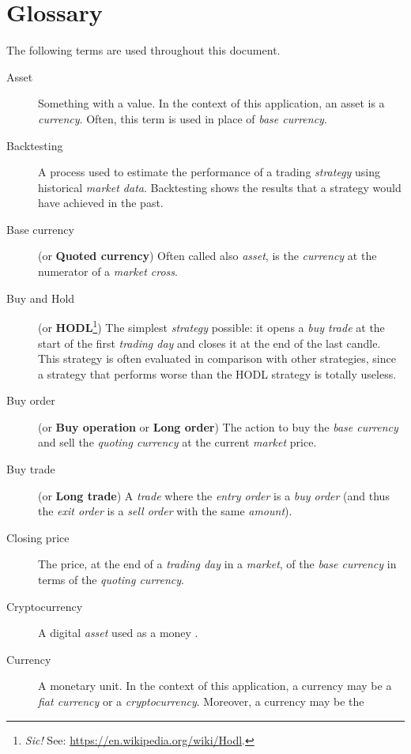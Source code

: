 \chapter{Glossary}\label{appendix:glossary}

The following terms are used throughout this document.

\begin{description}
	\item[Asset] Something with a value. In the context of this application,
		an asset is a \textit{currency}. Often, this term is used in
		place of \textit{base currency}.
	\item[Backtesting] A process used to estimate the performance of a
		trading \textit{strategy} using historical \textit{market data}.
		Backtesting shows the results that a strategy would have
		achieved in the past.
	\item[Base currency] (or \textbf{Quoted currency}) Often called also
		\textit{asset}, is the \textit{currency} at the numerator of a
		\textit{market cross}.
	\item[Buy and Hold] (or \textbf{HODL}\footnote{\textit{Sic!} See:
		\url{https://en.wikipedia.org/wiki/Hodl}.}) The simplest
		\textit{strategy} possible: it opens a \textit{buy trade} at the
		start of the first \textit{trading day} and closes it at the end
		of the last candle. This strategy is often evaluated in
		comparison with other strategies, since a strategy that performs
		worse than the HODL strategy is totally useless.
	\item[Buy order] (or \textbf{Buy operation} or \textbf{Long order}) The
		action to buy the \textit{base currency} and sell the
		\textit{quoting currency} at the current \textit{market} price.
	\item[Buy trade] (or \textbf{Long trade}) A \textit{trade} where the
		\textit{entry order} is a \textit{buy order} (and thus the
		\textit{exit order} is a \textit{sell order} with the same
		\textit{amount}).
	\item[Closing price] The price, at the end of a \textit{trading
		day} in a \textit{market}, of the \textit{base currency} in
		terms of the \textit{quoting currency}.
	\item[Cryptocurrency] A digital \textit{asset} used as a money
		.
	\item[Currency] A monetary unit. In the context of this application, a
		currency may be a \textit{fiat currency} or a
		\textit{cryptocurrency}. Moreover, a currency may be the

\end{description}
